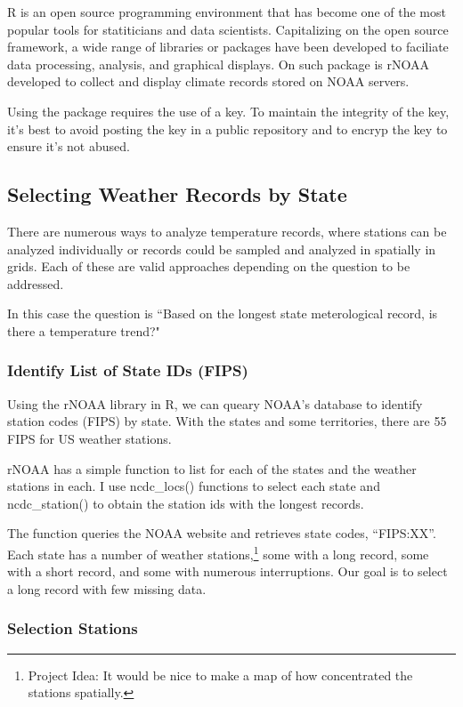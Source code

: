 \documentclass{article}\usepackage[]{graphicx}\usepackage[]{color}
\begin{document}
R is an open source programming environment that has become one of the most popular tools for statiticians and data scientists. Capitalizing on the open source framework, a wide range of libraries or packages have been developed to faciliate data processing, analysis, and graphical displays. On such package is rNOAA developed to collect and display climate records stored on NOAA servers.

Using the package requires the use of a key. To maintain the integrity of the key, it's best to avoid posting the key in a public repository and to encryp the key to ensure it's not abused. 

\subsection{Selecting Weather Records by State}

There are numerous ways to analyze temperature records, where stations can be analyzed individually or records could be sampled and analyzed in spatially in grids. Each of these are valid approaches depending on the question to be addressed. 

In this case the question is ``Based on the longest state meterological record, is there a temperature trend?"

\subsubsection{Identify List of State IDs (FIPS)}

Using the rNOAA library in R, we can queary NOAA's database to identify station codes (FIPS) by state. With the states and some territories, there are 55 FIPS for US weather stations. 

rNOAA has a simple function to list for each of the states and the weather stations in each. I use ncdc\_locs() functions to select each state and ncdc\_station() to obtain the station ids with the longest records. 



The function queries the NOAA website and retrieves state codes, ``FIPS:XX''. Each state has a number of weather stations,\footnote{Project Idea: It would be nice to make a map of how concentrated the stations spatially.} some with a long record, some with a short record, and some with numerous interruptions. Our goal is to select a long record with few missing data. 

\subsubsection{Selection Stations}
\end{document}
